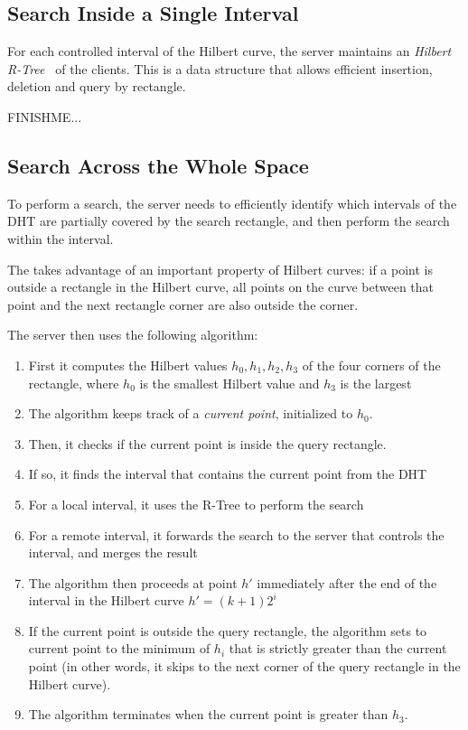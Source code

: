 \subsection{Search Inside a Single Interval}
For each controlled interval of the Hilbert curve, the server maintains an \textit{Hilbert R-Tree}~\cite{kamel1993hilbert} of the clients.
This is a data structure that allows efficient insertion, deletion and query by rectangle.

FINISHME...

\subsection{Search Across the Whole Space}
To perform a search, the server needs to efficiently identify which intervals of the DHT are partially covered by the search rectangle, and then perform the search within the interval.

The takes advantage of an important property of Hilbert curves: if a point is outside a rectangle in the Hilbert curve, all points on the curve between that point and the next rectangle corner are also outside the corner.

The server then uses the following algorithm:
\begin{enumerate}
\item First it computes the Hilbert values $h_0, h_1, h_2, h_3$ of the four corners of the rectangle, where $h_0$ is the smallest Hilbert value and $h_3$ is the largest
\item The algorithm keeps track of a \textit{current point}, initialized to $h_0$.
\item Then, it checks if the current point is inside the query rectangle.
\item If so, it finds the interval that contains the current point from the DHT
\item For a local interval, it uses the R-Tree to perform the search
\item For a remote interval, it forwards the search to the server that controls the interval, and merges the result
\item The algorithm then proceeds at point $h'$ immediately after the end of the interval in the Hilbert curve $h' = (k+1) 2^i$
\item If the current point is outside the query rectangle, the algorithm sets to current point to the minimum of $h_i$ that is strictly greater than the current point (in other words, it skips to the next corner of the query rectangle in the Hilbert curve).
\item The algorithm terminates when the current point is greater than $h_3$.
\end{enumerate}

